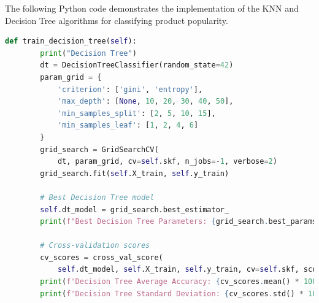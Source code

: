 \documentclass[a4paper,11pt]{article}
\begin{document}
The following Python code demonstrates the implementation of the KNN and Decision Tree algorithms for classifying product popularity.

\begin{lstlisting}[language=Python] 
    def train_decision_tree(self):
        print("Decision Tree")
        dt = DecisionTreeClassifier(random_state=42)
        param_grid = {
            'criterion': ['gini', 'entropy'],
            'max_depth': [None, 10, 20, 30, 40, 50],
            'min_samples_split': [2, 5, 10, 15],
            'min_samples_leaf': [1, 2, 4, 6]
        }
        grid_search = GridSearchCV(
            dt, param_grid, cv=self.skf, n_jobs=-1, verbose=2)
        grid_search.fit(self.X_train, self.y_train)

        # Best Decision Tree model
        self.dt_model = grid_search.best_estimator_
        print(f"Best Decision Tree Parameters: {grid_search.best_params_}")

        # Cross-validation scores
        cv_scores = cross_val_score(
            self.dt_model, self.X_train, self.y_train, cv=self.skf, scoring='accuracy')
        print(f'Decision Tree Average Accuracy: {cv_scores.mean() * 100:.2f}%')
        print(f'Decision Tree Standard Deviation: {cv_scores.std() * 100:.2f}%')
\end{lstlisting}
\end{document}

